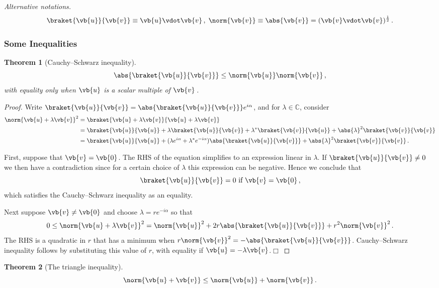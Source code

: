 \documentclass{article}
\theoremstyle{plain}\theoremheaderfont{\normalfont\itshape}\theorembodyfont{\rmfamily}\theoremseparator{.}\newtheorem*{rem}{Remark}\newtheorem*{ex}{Example}\newtheorem*{proof}{Proof}\newtheorem*{altp}{Alternative proof}
\theoremstyle{plain}\theoremheaderfont{\normalfont\bfseries}\theorembodyfont{\rmfamily}\theoremseparator{.}\newtheorem{thm}{Theorem}[section]\newtheorem{lem}[thm]{Lemma}\newtheorem{prop}[thm]{Proposition}\newtheorem*{cor}{Corollary}\newtheorem{defn}[thm]{Definition}\newtheorem{clm}[thm]{Claim}\newtheorem{clminproof}{Claim}
\theoremstyle{break}\theoremheaderfont{\normalfont\itshape}\theorembodyfont{\rmfamily}\theoremseparator{.\medskip}\newtheorem*{proofskip}{Proof}\newtheorem*{exs}{Examples}\newtheorem*{rems}{Remarks}
\theoremstyle{break}\theoremheaderfont{\normalfont\bfseries}\theorembodyfont{\rmfamily}\theoremseparator{.\medskip}\newtheorem{lemskip}[thm]{Lemma}\newtheorem{defnskip}[thm]{Definition}\newtheorem{propskip}[thm]{Proposition}\newtheorem{thmskip}[thm]{Theorem}
\numberwithin{equation}{section}
\newcommand{\qed}{\hfill\ensuremath{\Box}}
\begin{document}
	\textit{Alternative notations.}
	\[\braket{\vb{u}}{\vb{v}}\equiv\vb{u}\vdot\vb{v}\,,\;\norm{\vb{v}}\equiv\abs{\vb{v}}=(\vb{v}\vdot\vb{v})^{\frac{1}{2}}\,.\]
	\subsubsection{Some Inequalities}
	\begin{thm}[Cauchy--Schwarz inequality]
		\[\abs{\braket{\vb{u}}{\vb{v}}}\le\norm{\vb{u}}\norm{\vb{v}}\,,\]
		with equality only when \(\vb{u}\) is a scalar multiple of \(\vb{v}\)\,.
	\end{thm}

	\begin{proof} Write \(\braket{\vb{u}}{\vb{v}}=\abs{\braket{\vb{u}}{\vb{v}}}e^{i\alpha}\), and for \(\lambda\in\mathbb{C}\), consider
		\begin{align*}
			\norm{\vb{u}+\lambda\vb{v}}^2&=\braket{\vb{u}+\lambda\vb{v}}{\vb{u}+\lambda\vb{v}}\\
			&=\braket{\vb{u}}{\vb{u}}+\lambda\braket{\vb{u}}{\vb{v}}+\lambda^*\braket{\vb{v}}{\vb{u}}+\abs{\lambda}^2\braket{\vb{v}}{\vb{v}}\\
			&=\braket{\vb{u}}{\vb{u}}+(\lambda e^{i\alpha}+\lambda^* e^{-i\alpha})\abs{\braket{\vb{u}}{\vb{v}}}+\abs{\lambda}^2\braket{\vb{v}}{\vb{v}}\,.
		\end{align*}
		
		First, suppose that \(\vb{v}=\vb{0}\). The RHS of the equation simplifies to an expression linear in \(\lambda\). If \(\braket{\vb{u}}{\vb{v}}\ne 0\) we then have a contradiction since for a certain choice of \(\lambda\) this expression can be negative. Hence we conclude that
		\[\braket{\vb{u}}{\vb{v}}=0 \text{ if }\vb{v}=\vb{0}\,,\]
		which satisfies the Cauchy--Schwarz inequality as an equality.
		
		Next suppose \(\vb{v}\ne\vb{0}\) and choose \(\lambda=re^{-i\alpha}\) so that
		\[0\le\norm{\vb{u}+\lambda\vb{v}}^2=\norm{\vb{u}}^2+2r\abs{\braket{\vb{u}}{\vb{v}}}+r^2\norm{\vb{v}}^2\,.\]
		The RHS is a quadratic in \(r\) that has a minimum when \(r\norm{\vb{v}}^2=-\abs{\braket{\vb{u}}{\vb{v}}}\). Cauchy--Schwarz inequality follows by substituting this value of \(r\), with equality if \(\vb{u}=-\lambda\vb{v}\).\qed
	\end{proof}

	\begin{thm}[The triangle inequality]
		\[\norm{\vb{u}+\vb{v}}\le\norm{\vb{u}}+\norm{\vb{v}}\,.\]
	\end{thm}
\end{document}
